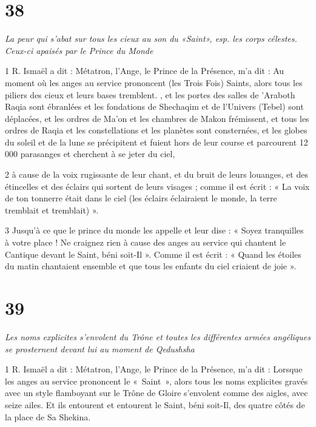 \chapter{38}

\par \textit{La peur qui s'abat sur tous les cieux au son du «Saint», esp. les corps célestes. Ceux-ci apaisés par le Prince du Monde}

\par 1 R. Ismaël a dit : Métatron, l'Ange, le Prince de la Présence, m'a dit : Au moment où les anges au service prononcent (les Trois Fois) Saints, alors tous les piliers des cieux et leurs bases tremblent. , et les portes des salles de 'Araboth Raqia sont ébranlées et les fondations de Shechaqim et de l'Univers (Tebel) sont déplacées, et les ordres de Ma'on et les chambres de Makon frémissent, et tous les ordres de Raqia et les constellations et les planètes sont consternées, et les globes du soleil et de la lune se précipitent et fuient hors de leur course et parcourent 12 000 parasanges et cherchent à se jeter du ciel,

\par 2 à cause de la voix rugissante de leur chant, et du bruit de leurs louanges, et des étincelles et des éclairs qui sortent de leurs visages ; comme il est écrit : « La voix de ton tonnerre était dans le ciel (les éclairs éclairaient le monde, la terre tremblait et tremblait) ».

\par 3 Jusqu'à ce que le prince du monde les appelle et leur dise : « Soyez tranquilles à votre place ! Ne craignez rien à cause des anges au service qui chantent le Cantique devant le Saint, béni soit-Il ». Comme il est écrit : « Quand les étoiles du matin chantaient ensemble et que tous les enfants du ciel criaient de joie ».



\chapter{39}

\par \textit{Les noms explicites s'envolent du Trône et toutes les différentes armées angéliques se prosternent devant lui au moment de Qedushsha}

\par 1 R. Ismaël a dit : Métatron, l'Ange, le Prince de la Présence, m'a dit : Lorsque les anges au service prononcent le « Saint », alors tous les noms explicites gravés avec un style flamboyant sur le Trône de Gloire s'envolent comme des aigles, avec seize ailes. Et ils entourent et entourent le Saint, béni soit-Il, des quatre côtés de la place de Sa Shekina.

